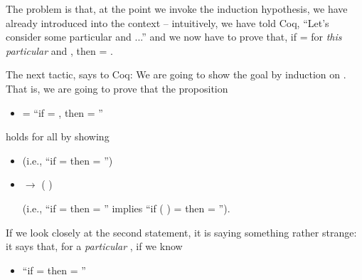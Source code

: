 \documentclass[12pt]{report}
\begin{document}
 The problem is that, at the point we invoke the induction
    hypothesis, we have already introduced  into the context -- 
    intuitively, we have told Coq, ``Let's consider some particular
     and ...'' and we now have to prove that, if   =
      for \textit{this particular}  and , then  = .


    The next tactic,   says to Coq: We are going to show
    the goal by induction on .  That is, we are going to prove that
    the proposition



\begin{itemize}
\item  {}   =  ``if   =  , then  = ''

\end{itemize}


    holds for all  by showing



\begin{itemize}
\item  {}               


         (i.e., ``if   =   then  = '')



\item  {}  \ensuremath{\rightarrow}  ( )  


        (i.e., ``if   =   then  = '' implies ``if
         ( ) =   then   = '').

\end{itemize}


    If we look closely at the second statement, it is saying something
    rather strange: it says that, for a \textit{particular} , if we know



\begin{itemize}
\item  ``if   =   then  = ''

\end{itemize}
\end{document}
